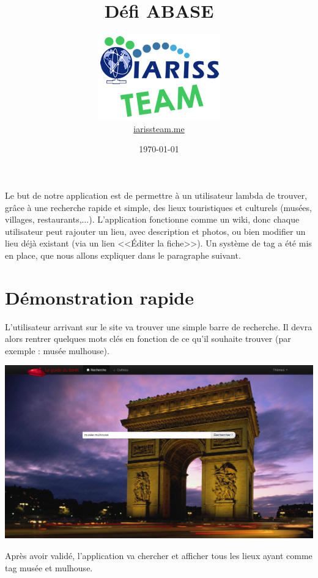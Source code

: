 \documentclass[12pt, a4paper]{article}
\title{Défi ABASE}
\newcommand{\espace}{\vspace{.8cm}}
\begin{document}
\author{\includegraphics{../_img/iariss_team.png} \\ {\sffamily \href{http://iarissteam.me}{iarissteam.me}}}
\date{\today}

\maketitle{}

{\sffamily Le but de notre application est de permettre à un utilisateur lambda de trouver, grâce à une recherche rapide et simple, des lieux touristiques et culturels (musées, villages, restaurants,...). L'application fonctionne comme un wiki, donc chaque utilisateur peut rajouter un lieu, avec description et photos, ou bien modifier un lieu déjà existant (via un lien <<Éditer la fiche>>). Un système de tag a été mis en place, que nous allons expliquer dans le paragraphe suivant.} 

\espace{}
\section{Démonstration rapide}
L'utilisateur arrivant sur le site va trouver une simple barre de recherche. Il devra alors rentrer quelques mots clés en fonction de ce qu'il souhaite trouver (par exemple : \og{}musée mulhouse\fg{}).

\espace{}
\includegraphics[width=.9\textwidth, keepaspectratio=true]{img/abase1.png}

\espace{}
Après avoir validé, l'application va chercher et afficher tous les lieux ayant comme tag \og{}musée\fg{} et \og{}mulhouse\fg{}.
\end{document}

